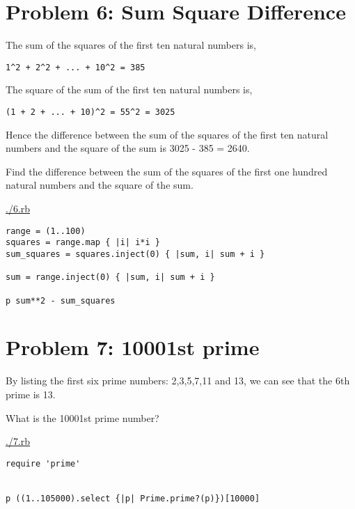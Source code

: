 \documentclass[11pt]{article}
\begin{document}
\section{Problem 6: Sum Square Difference}
\label{sec-6}

The sum of the squares of the first ten natural numbers is,

\begin{verbatim}
1^2 + 2^2 + ... + 10^2 = 385
\end{verbatim}

The square of the sum of the first ten natural numbers is,

\begin{verbatim}
(1 + 2 + ... + 10)^2 = 55^2 = 3025
\end{verbatim}

Hence the difference between the sum of the squares of the first ten natural 
numbers and the square of the sum is 3025 - 385 = 2640.

Find the difference between the sum of the squares of the first one hundred 
natural numbers and the square of the sum.

\url{./6.rb}

\begin{verbatim}
range = (1..100)
squares = range.map { |i| i*i }
sum_squares = squares.inject(0) { |sum, i| sum + i }

sum = range.inject(0) { |sum, i| sum + i }

p sum**2 - sum_squares
\end{verbatim}

\section{Problem 7: 10001st prime}
\label{sec-7}

By listing the first six prime numbers: 2,3,5,7,11 and 13, we can see that the
6th prime is 13.

What is the 10001st prime number?

\url{./7.rb}

\begin{verbatim}
require 'prime'


p ((1..105000).select {|p| Prime.prime?(p)})[10000]
\end{verbatim}
\end{document}
